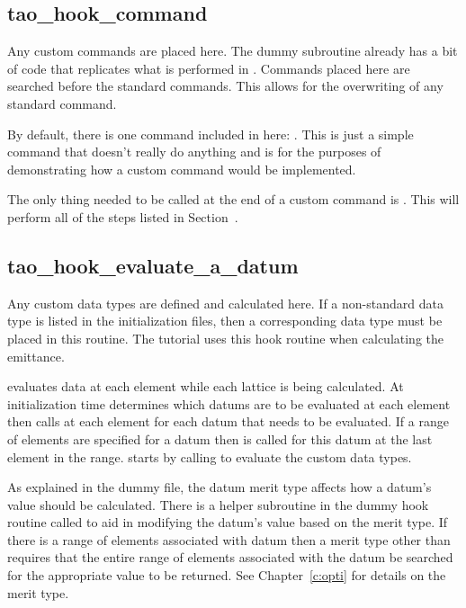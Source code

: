 \subsection{tao\_hook\_command}

Any custom commands are placed here. The dummy subroutine already has
a bit of code that replicates what is performed in
. Commands placed here are searched before the
standard \tao commands. This allows for the overwriting of any
standard \tao command.

By default, there is one command included in here: . This
is just a simple command that doesn't really do anything and is for
the purposes of demonstrating how a custom command would be
implemented.

The only thing needed to be called at the end of a custom command is
. This will perform all of the steps listed in
Section~.

\subsection{tao\_hook\_evaluate\_a\_datum}

Any custom data types are defined and calculated here. If a
non-standard data type is listed in the initialization files, then a
corresponding data type must be placed in this routine. The tutorial
uses this hook routine when calculating the emittance.

\tao evaluates data at each element while each lattice is being
calculated. At initialization time \tao determines which datums are to
be evaluated at each element then calls  at
each element for each datum that needs to be evaluated. If a range of
elements are specified for a datum then  is
called for this datum at the last element in the
range.  starts by calling
 to evaluate the custom data types.

As explained in the dummy file, the datum merit type affects how a
datum's value should be calculated. There is a helper subroutine in
the dummy hook routine called  to aid in modifying the
datum's value based on the merit type. If there is a range of elements
associated with datum then a merit type other than 
requires that the entire range of elements associated with the datum
be searched for the appropriate value to be returned.  See
Chapter~\ref{c:opti} for details on the merit type.

